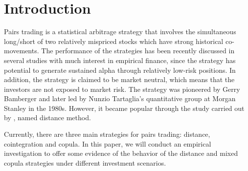 \documentclass[a4paper]{article}
\begin{document}
	
	
	
	
	\section{Introduction}

	Pairs trading is a statistical arbitrage strategy that involves the simultaneous long/short of two relatively mispriced stocks which have strong historical co-movements. The performance of the strategies has been recently discussed in several studies with much interest in empirical finance, since the strategy has potential to generate sustained alpha through relatively low-risk positions. In addition, the strategy is claimed to be market neutral, which means that the investors are not exposed to market risk. The strategy was pioneered by Gerry Bamberger and later led by Nunzio Tartaglia's quantitative group at Morgan Stanley in the 1980s. However, it became popular through the study carried out by \citet*{ggr06}, named distance method.
	
	Currently, there are three main strategies for pairs trading: distance, cointegration and copula. In this paper, we will conduct an empirical investigation to offer some evidence of the behavior of the distance and mixed copula strategies under different investment scenarios. 
	
\end{document}
